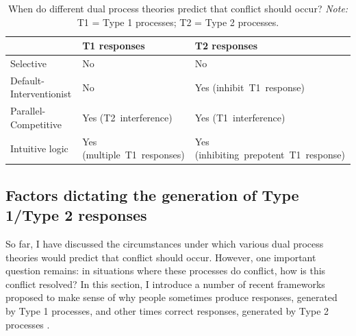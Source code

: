 \begin{table}
  \centering
  \caption[Predictions about conflict from various dual process theories]{
    When do different dual process theories predict that conflict should occur?
    \emph{Note:} T1 = Type 1 processes; T2 = Type 2 processes.
  }
  \begin{tabular}{l L{.3\textwidth} L{.3\textwidth} }
    \toprule
    & T1 responses                & T2 responses \\ %
    \midrule
    Selective               & No                          & No \\
    Default-Interventionist & No                          & Yes (inhibit~T1~response) \\
    Parallel-Competitive    & Yes (T2~interference)       & Yes (T1~interference) \\
    Intuitive logic         & Yes (multiple~T1~responses) & Yes (inhibiting~prepotent~T1~response) \\ 
    \bottomrule 
  \end{tabular}
\end{table}


\subsection{Factors dictating the generation of Type 1/Type 2 responses}
\label{subsec:chapter1-dual-process-factors}


So far, I have discussed the circumstances under which
various dual process theories would predict that conflict should occur.
However, one important question remains:
in situations where these processes do conflict,
how is this conflict resolved?
In this section, I introduce a number of recent frameworks proposed
to make sense of why people sometimes
produce responses, generated by Type 1 processes,
and other times correct responses, generated by Type 2 processes
\citep[but again, see][]{DeNeys2012, Handley2015}.

